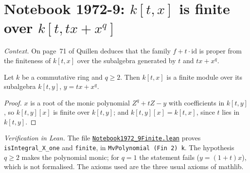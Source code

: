 \section[Notebook 1972-9: a finite extension]{Notebook 1972-9: $k[t, x]$ is finite over $k[t, tx + x^q]$\protect{}}\label{sec:quillen-1972-9-finite}

\emph{Context.} On page~71 of  Quillen deduces that the family $f + t\cdot\mathrm{id}$ is proper from the finiteness of $k[t, x]$ over the subalgebra generated by $t$ and $tx + x^q$.

\begin{encadre}
\begin{theoreme}\label{thm:quillen-1972-9-finite}
Let $k$ be a commutative ring and $q \ge 2$. Then $k[t, x]$ is a finite module over its subalgebra $k[t, y]$, $y = tx + x^q$.
\end{theoreme}
\end{encadre}

\begin{proof}
$x$ is a root of the monic polynomial $Z^q + tZ - y$ with coefficients in $k[t, y]$, so $k[t, y][x]$ is finite over $k[t, y]$; and $k[t, y][x] = k[t, x]$, since $t$ lies in $k[t, y]$.
\end{proof}

\emph{Verification in Lean.} The file \href{\leanblobmain/Notebook1972_9Finite.lean}{\texttt{Notebook1972\_9Finite.\allowbreak{}lean}} proves \texttt{isIntegral\_X\_one} and \texttt{finite}, in \texttt{MvPolynomial (Fin 2) k}. The hypothesis $q \ge 2$ makes the polynomial monic; for $q = 1$ the statement fails ($y = (1 + t)x$), which is not formalised. The axioms used are the three usual axioms of mathlib.

